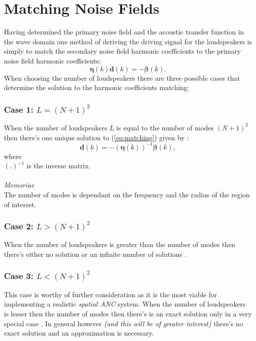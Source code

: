 \section{Matching Noise Fields}\label{sec:matching}
Having determined the primary noise field and the acoustic transfer function in the wave domain one method of deriving the driving signal for the loudspeakers is simply to match the secondary noise field harmonic coefficients to the primary noise field harmonic coefficients\cite{Zhang2019}:
\begin{equation}
    \boldsymbol{\eta}(k)\mathbf{d}(k)=-\boldsymbol{\beta}(k).
    \label{eq:matching}
\end{equation}
When choosing the number of loudspeakers there are three possible cases that determine the solution to the harmonic coefficients matching:

\subsubsection{Case 1: $L = (N + 1)^2$}
When the number of loudspeakers $L$ is equal to the number of modes $(N+1)^2$ then there's one unique solution to (\ref{eq:matching}) given by \cite{Zhang2019}:
\begin{equation}
    \mathbf{d}(k) = -(\boldsymbol{\eta}(k))^{-1}\boldsymbol{\beta}(k),
\end{equation}
where\\
$(.)^{-1}$ is the inverse matrix.\\\\
\textit{Memoriae}\\
The number of modes is dependant on the frequency and the radius of the region of interest.
\subsubsection{Case 2: $L > (N + 1)^2$}
When the number of loudspeakers is greater than the number of modes then there's either no solution or an infinite number of solutions \cite{Zhang2019}.
\subsubsection{Case 3: $L < (N + 1)^2$}
This case is worthy of further consideration as it is the most viable for implementing a realistic \textit{spatial ANC} system. When the number of loudspeakers is lesser then the number of modes then there's is an exact solution only in a very special case \cite{Zhang2019}. In general however \textit{(and this will be of greater interest)} there's no exact solution and an approximation is necessary.
